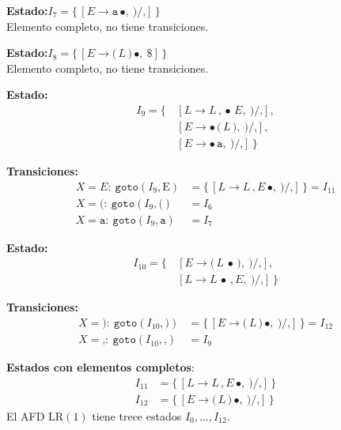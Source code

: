 \documentclass[12pt,letterpaper]{article}
\newcommand{\nt}[1]{\textit{#1}}
\newcommand{\tk}[1]{\texttt{#1}}
\newcommand{\tx}[1]{\text{#1}}
\newcommand{\lr}{\mathrm{LR(1)}}
\begin{document}
\begin{enumerate}[label=\arabic*.]
  \medskip

  \textbf{Estado:}\quad $I_7 = \{\,[\nt{E}\to\tk{a}\,\bullet,\ \tk{)}/\tk{,}]\,\}$\\
  Elemento completo, no tiene transiciones.

  \medskip

  \textbf{Estado:}\quad $I_8 = \{\,[\nt{E}\to\tk{(}\,\nt{L}\,\tk{)}\,\bullet,\ \tk{\$}]\,\}$\\
  Elemento completo, no tiene transiciones.

  \medskip

  \textbf{Estado:}
  \[
  \begin{aligned}
    I_9 = \{\, & [\nt{L}\to\nt{L}\,\tk{,}\,\bullet\,\nt{E},\ \tk{)}/\tk{,}],\\
               & [\nt{E}\to\bullet\,\tk{(}\,\nt{L}\,\tk{)},\ \tk{)}/\tk{,}],\\
               & [\nt{E}\to\bullet\,\tk{a},\ \tk{)}/\tk{,}]\,\}
    \end{aligned}
  \]

  \textbf{Transiciones:}
  \[
  \begin{aligned}
    X=\nt{E}:\ \texttt{goto}(I_9,\tx{E}) &= \{\,[\nt{L}\to\nt{L}\,\tk{,}\,\nt{E}\,\bullet,\ \tk{)}/\tk{,}]\,\} = \boxed{I_{11}}\\[3pt]
    X=\tk{(}:\ \texttt{goto}(I_9,\tk{(}) &= I_6\\[3pt]
    X=\tk{a}:\ \texttt{goto}(I_9,\tk{a}) &= I_7
  \end{aligned}
  \]

  \medskip

  \textbf{Estado:}
  \[
  \begin{aligned}
    I_{10} = \{\, & [\nt{E}\to\tk{(}\,\nt{L}\,\bullet\,\tk{)},\ \tk{)}/\tk{,}],\\
                 & [\nt{L}\to\nt{L}\,\bullet\,\tk{,}\,\nt{E},\ \tk{)}/\tk{,}]\,\}
    \end{aligned}
  \]

  \textbf{Transiciones:}
  \[
  \begin{aligned}
    X=\tk{)}:\ \texttt{goto}(I_{10},\tk{)}) &= \{\,[\nt{E}\to\tk{(}\,\nt{L}\,\tk{)}\,\bullet,\ \tk{)}/\tk{,}]\,\} = \boxed{I_{12}}\\[3pt]
    X=\tk{,}:\ \texttt{goto}(I_{10},\tk{,}) &= I_9
  \end{aligned}
  \]

  \medskip

  \textbf{Estados con elementos completos}:
  \[
  \begin{aligned}
    I_{11} &= \{\,[\nt{L}\to\nt{L}\,\tk{,}\,\nt{E}\,\bullet,\ \tk{)}/\tk{,}]\,\}\\[3pt]
    I_{12} &= \{\,[\nt{E}\to\tk{(}\,\nt{L}\,\tk{)}\,\bullet,\ \tk{)}/\tk{,}]\,\}
  \end{aligned}
  \]
  El AFD $\lr$ tiene trece estados $I_0,\ldots,I_{12}$.


\end{enumerate}
\end{document}
